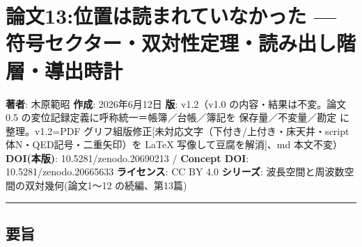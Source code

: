 \documentclass[
]{ltjsarticle}
\author{}
\date{}
\begin{document}
\section{論文13:位置は読まれていなかった ---
符号セクター・双対性定理・読み出し階層・導出時計}\label{ux8ad6ux658713ux4f4dux7f6eux306fux8aadux307eux308cux3066ux3044ux306aux304bux3063ux305f-ux7b26ux53f7ux30bbux30afux30bfux30fcux53ccux5bfeux6027ux5b9aux7406ux8aadux307fux51faux3057ux968eux5c64ux5c0eux51faux6642ux8a08}

\textbf{著者}: 木原範昭 \textbf{作成}: 2026年6月12日 \textbf{版}:
v1.2（v1.0 の内容・結果は不変。論文0.5
の変位記録定義に呼称統一＝帳簿／台帳／簿記を 保存量／不変量／勘定
に整理。v1.2=PDF
グリフ組版修正{[}未対応文字（下付き/上付き・床天井・script体N・QED記号・二重矢印）を
LaTeX 写像して豆腐を解消{]}、md 本文不変） \textbf{DOI(本版)}:
10.5281/zenodo.20690213 / \textbf{Concept DOI}: 10.5281/zenodo.20665633
\textbf{ライセンス}: CC BY 4.0 \textbf{シリーズ}:
波長空間と周波数空間の双対幾何(論文1〜12 の続編、第13篇)

\begin{center}\rule{0.5\linewidth}{0.5pt}\end{center}

\subsection{要旨}\label{ux8981ux65e8}
\end{document}
